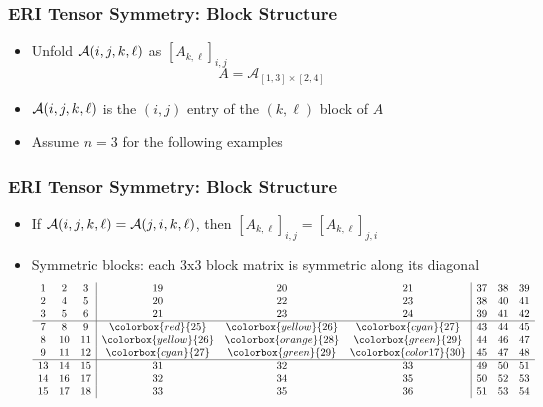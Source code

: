 \documentclass[bigger]{beamer}
\begin{document}
\begin{frame}
\frametitle{ERI Tensor Symmetry: Block Structure}
\label{sec-1-15}
\begin{itemize}

\item Unfold ${\cal A}(i,j,k,\ell)$ as $[A_{k,\ell}]_{i,j}$
\label{sec-1-15-1}%
\begin{equation*}
A=\mathcal{A}_{[1, 3]\times[2, 4]}
\end{equation*}

\item ${\cal A}(i,j,k,\ell)$ is the $(i,j)$ entry of the $(k,\ell)$ block of $A$
\label{sec-1-15-2}%

\item Assume $n=3$ for the following examples
\label{sec-1-15-3}%
\end{itemize} %
\end{frame}
\begin{frame}
\frametitle{ERI Tensor Symmetry: Block Structure}
\label{sec-1-16}
\begin{itemize}

\item If ${\cal A}(i,j,k,\ell) = {\cal A}(j,i,k,\ell)$, then $[A_{k,\ell}]_{i,j}=[A_{k,\ell}]_{j,i}$
\label{sec-1-16-1}%

\item Symmetric blocks: each 3x3 block matrix is symmetric along its diagonal\\
\label{sec-1-16-2}%
\[
\begin{array}{ccc|ccc|ccc}
1 &  2 &  3 &  19 &  20 &  21 &  37 &  38 &  39 \\
2 &  4 &  5 &  20 &  22 &  23 &  38 &  40 &  41 \\
3 &  5 &  6 &  21 &  23 &  24 &  39 &  41 &  42 \\
\hline
7 &  8 &  9 &  \colorbox{red}{25} &  \colorbox{yellow}{26} &  \colorbox{cyan}{27} &  43 &  44 &  45 \\
8 &  10 &  11 &  \colorbox{yellow}{26} &  \colorbox{orange}{28} &  \colorbox{green}{29} &  44 &  46 &  47 \\
9 &  11 &  12 &  \colorbox{cyan}{27} &  \colorbox{green}{29} &  \colorbox{color17}{30} &  45 &  47 &  48 \\
\hline
13 &  14 &  15 &  31 &  32 &  33 &  49 &  50 &  51 \\
14 &  16 &  17 &  32 &  34 &  35 &  50 &  52 &  53 \\
15 &  17 &  18 &  33 &  35 &  36 &  51 &  53 &  54 \\
\end{array}
\]
\end{itemize} %
\end{frame}
\end{document}

